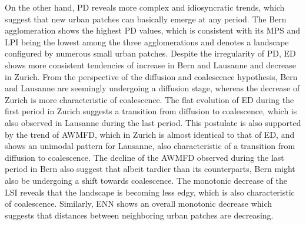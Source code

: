 \documentclass[10pt,letterpaper]{article}
\begin{document}
On the other hand, PD reveals more complex and idiosyncratic trends, which suggest that new urban patches can basically emerge at any period. %
The Bern agglomeration shows the highest PD values, which is consistent with its MPS and LPI being the lowest among the three agglomerations and denotes a landscape configured by numerous small urban patches.
Despite the irregularity of PD, ED shows more consistent tendencies of increase in Bern and Lausanne and decrease in Zurich. From the perspective of the diffusion and coalescence hypothesis, Bern and Lausanne are seemingly undergoing a diffusion stage, whereas the decrease of Zurich is more characteristic of coalescence. %
The flat evolution of ED during the first period in Zurich suggests a transition from diffusion to coalescence, which is also observed in Lausanne during the last period.
This postulate is also supported by the trend of AWMFD, which in Zurich is almost identical to that of ED, and shows an unimodal pattern for Lausanne, also characteristic of a transition from diffusion to coalescence. The decline of the AWMFD observed during the last period in Bern also suggest that albeit tardier than its counterparts, Bern might also be undergoing a shift towards coalescence.
The monotonic decrease of the LSI reveals that the landscape is becoming less edgy, which is also characteristic of coalescence.
Similarly, ENN shows an overall monotonic decrease which suggests that distances between neighboring urban patches are decreasing. %
\end{document}
